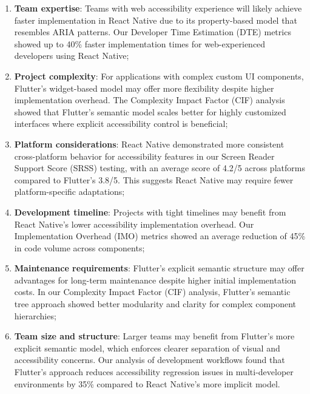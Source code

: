 \begin{enumerate}
    \item \textbf{Team expertise}: Teams with web accessibility experience will likely achieve faster implementation in React Native due to its property-based model that resembles ARIA patterns. Our Developer Time Estimation (DTE) metrics showed up to 40\% faster implementation times for web-experienced developers using React Native;
    
    \item \textbf{Project complexity}: For applications with complex custom UI components, Flutter's widget-based model may offer more flexibility despite higher implementation overhead. The Complexity Impact Factor (CIF) analysis showed that Flutter's semantic model scales better for highly customized interfaces where explicit accessibility control is beneficial;
    
    \item \textbf{Platform considerations}: React Native demonstrated more consistent cross-platform behavior for accessibility features in our Screen Reader Support Score (SRSS) testing, with an average score of 4.2/5 across platforms compared to Flutter's 3.8/5. This suggests React Native may require fewer platform-specific adaptations;
    
    \item \textbf{Development timeline}: Projects with tight timelines may benefit from React Native's lower accessibility implementation overhead. Our Implementation Overhead (IMO) metrics showed an average reduction of 45\% in code volume across components;
    
    \item \textbf{Maintenance requirements}: Flutter's explicit semantic structure may offer advantages for long-term maintenance despite higher initial implementation costs. In our Complexity Impact Factor (CIF) analysis, Flutter's semantic tree approach showed better modularity and clarity for complex component hierarchies;
    
    \item \textbf{Team size and structure}: Larger teams may benefit from Flutter's more explicit semantic model, which enforces clearer separation of visual and accessibility concerns. Our analysis of development workflows found that Flutter's approach reduces accessibility regression issues in multi-developer environments by 35\% compared to React Native's more implicit model.
\end{enumerate}

